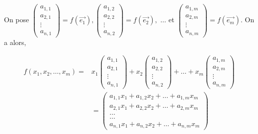 \documentclass[12pt]{article}
\theoremstyle{break}
\begin{document}
On pose $\left(\begin{array}{c}a_{1,1} \\ a_{2,1} \\ \vdots \\ a_{n, 1}\end{array}\right)=f\left(\overrightarrow{e_{1}}\right),\left(\begin{array}{c}a_{1,2} \\ a_{2,2} \\ \vdots \\ a_{n, 2}\end{array}\right)=f\left(\overrightarrow{e_{2}}\right),$ $\ldots$ et $\left(\begin{array}{c}a_{1, m} \\ a_{2, m} \\ \vdots \\ a_{n, m}\end{array}\right)=f\left(\overrightarrow{e_{m}}\right)$. On a alors,

$$
\begin{aligned}
f\left(x_{1}, x_{2}, \ldots, x_{m}\right)= & x_{1}\left(\begin{array}{c}
a_{1,1} \\
a_{2,1} \\
\vdots \\
a_{n, 1}
\end{array}\right)+x_{2}\left(\begin{array}{c}
a_{1,2} \\
a_{2,2} \\
\vdots \\
a_{n, 2}
\end{array}\right)+\ldots+x_{m}\left(\begin{array}{c}
a_{1, m} \\
a_{2, m} \\
\vdots \\
a_{n, m}
\end{array}\right) \\
& =\left(\begin{array}{c}
a_{1,1} x_{1}+a_{1,2} x_{2}+\ldots+a_{1, m} x_{m} \\
a_{2,1} x_{1}+a_{2,2} x_{2}+\ldots+a_{2, m} x_{m} \\
\ldots \\
\ldots \\
a_{n, 1} x_{1}+a_{n, 2} x_{2}+\ldots+a_{n, m} x_{m}
\end{array}\right)
\end{aligned}
$$
\end{document}
